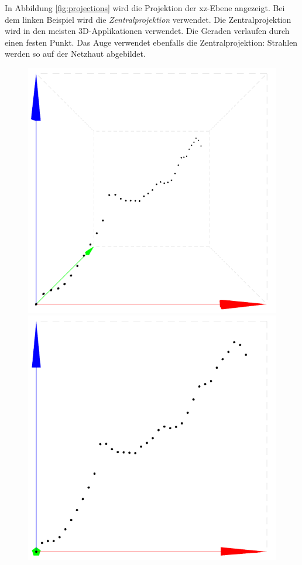 In Abbildung \ref{fig:projections} wird die Projektion der xz-Ebene angezeigt. Bei dem linken Beispiel wird die \textit{Zentralprojektion} verwendet. Die Zentralprojektion wird in den meisten 3D-Applikationen verwendet. Die Geraden verlaufen durch einen festen Punkt. Das Auge verwendet ebenfalls die Zentralprojektion: Strahlen werden so auf der Netzhaut abgebildet.

\begin{figure}[!htbp]
	\centering
	\begin{minipage}{.45\textwidth}
		\includegraphics[width=\linewidth]{images/persp}
	\end{minipage}
	\begin{minipage}{.45\textwidth}
		\includegraphics[width=\linewidth]{images/ortho}

\end{minipage}
\end{figure}
